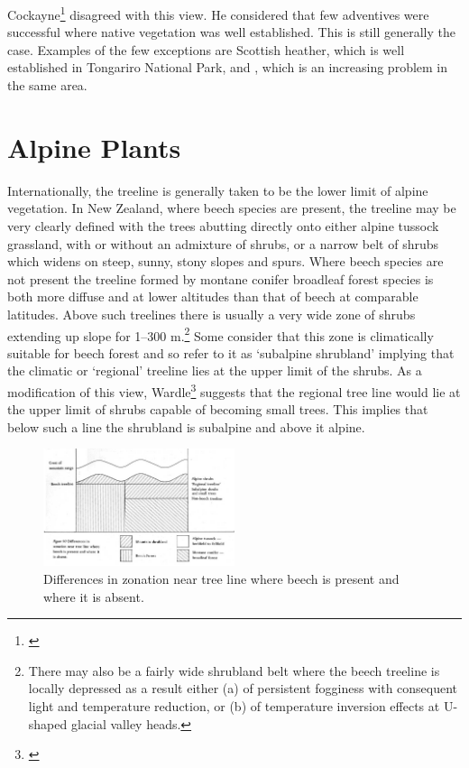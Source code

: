 Cockayne\footnote{\cite{cockayne1967plants}} disagreed with this view.
He considered that few adventives were successful where native vegetation was well established.
This is still generally the case.
Examples of the few exceptions are Scottish heather, which is well established in Tongariro National Park, and , which is an increasing problem in the same area.

\chapter{Alpine Plants}

Internationally, the treeline is generally taken to be the lower limit of alpine vegetation.
In New Zealand, where beech species are present, the treeline may be very clearly defined with the trees abutting directly onto either alpine tussock grassland, with or without an admixture of shrubs, or a narrow belt of shrubs which widens on steep, sunny, stony slopes and spurs.
Where beech species are not present the treeline formed by montane conifer broadleaf forest species is both more diffuse and at lower altitudes than that of beech at comparable latitudes.
Above such treelines there is usually a very wide zone of shrubs extending up slope for 1--300 m.\footnote{There may also be a fairly wide shrubland belt where the beech treeline is locally depressed as a result either (a) of persistent fogginess with consequent light and temperature reduction, or (b) of temperature inversion effects at U-shaped glacial valley heads.}
Some consider that this zone is climatically suitable for beech forest and so refer to it as `subalpine shrubland' implying that the climatic or `regional' treeline lies at the upper limit of the shrubs.
As a modification of this view, Wardle\footnote{\cite{wardle1965comparison}} suggests that the regional tree line would lie at the upper limit of shrubs capable of becoming small trees.
This implies that below such a line the shrubland is subalpine and above it alpine.

\begin{figure}
	\includegraphics[width=0.5\textwidth]{graphics/figure90zonation.jpg}
	\centering
	\caption[Differences in zonation]{Differences in zonation near tree line where beech is present and where it is absent.}%
	\label{fig:90zonation}
\end{figure}

